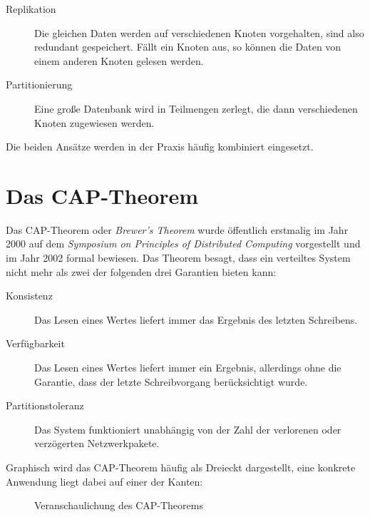 \documentclass[a4paper,11pt]{scrartcl}
\begin{document}
  \begin{description}
    \item[Replikation] Die gleichen Daten werden auf verschiedenen Knoten
      vorgehalten, sind also redundant gespeichert. Fällt ein Knoten aus, so
      können die Daten von einem anderen Knoten gelesen werden.
    \item[Partitionierung] Eine große Datenbank wird in Teilmengen zerlegt, die
      dann verschiedenen Knoten zugewiesen werden.
  \end{description}

  Die beiden Ansätze werden in der Praxis häufig kombiniert eingesetzt.

  \section{Das CAP-Theorem}
  Das CAP-Theorem oder \textit{Brewer's Theorem} wurde öffentlich erstmalig im
  Jahr 2000 auf dem \textit{Symposium on Principles of Distributed Computing}
  vorgestellt und im Jahr 2002 formal bewiesen. Das Theorem besagt, dass ein
  verteiltes System nicht mehr als zwei der folgenden drei Garantien bieten
  kann:\cite[S.~51-59]{brewer02}

  \begin{description}
    \item[Konsistenz] Das Lesen eines Wertes liefert immer das Ergebnis des
      letzten Schreibens.
    \item[Verfügbarkeit] Das Lesen eines Wertes liefert immer ein Ergebnis,
      allerdings ohne die Garantie, dass der letzte Schreibvorgang berücksichtigt
      wurde.
    \item[Partitionstoleranz] Das System funktioniert unabhängig von der Zahl der
      verlorenen oder verzögerten Netzwerkpakete.
  \end{description}

  Graphisch wird das CAP-Theorem häufig als Dreieckt dargestellt, eine konkrete
  Anwendung liegt dabei auf einer der Kanten:

  \begin{figure}[!h]
    \centering
    \caption{Veranschaulichung des CAP-Theorems}
  \end{figure}
\end{document}
